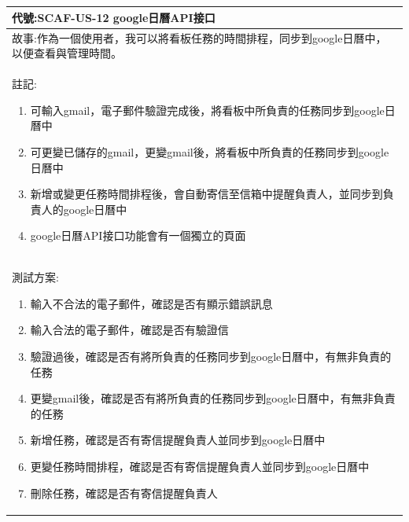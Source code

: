 \documentclass{report}
\begin{document}
\subsection*{}
\fontsize{12}{20}\selectfont
\begin{tabularx}{\textwidth}{|X|}
  \hline
  代號:SCAF-US-12 google日曆API接口 \\
  \hline
  故事:作為一個使用者，我可以將看板任務的時間排程，同步到google日曆中，以便查看與管理時間。 \\
  \hline
  註記:
  \begin{enumerate}
    \item 可輸入gmail，電子郵件驗證完成後，將看板中所負責的任務同步到google日曆中
    \item 可更變已儲存的gmail，更變gmail後，將看板中所負責的任務同步到google日曆中
    \item 新增或變更任務時間排程後，會自動寄信至信箱中提醒負責人，並同步到負責人的google日曆中
    \item google日曆API接口功能會有一個獨立的頁面
  \end{enumerate} \\
  \hline
  測試方案:
  \begin{enumerate}
    \item 輸入不合法的電子郵件，確認是否有顯示錯誤訊息
    \item 輸入合法的電子郵件，確認是否有驗證信
    \item 驗證過後，確認是否有將所負責的任務同步到google日曆中，有無非負責的任務
    \item 更變gmail後，確認是否有將所負責的任務同步到google日曆中，有無非負責的任務
    \item 新增任務，確認是否有寄信提醒負責人並同步到google日曆中
    \item 更變任務時間排程，確認是否有寄信提醒負責人並同步到google日曆中
    \item 刪除任務，確認是否有寄信提醒負責人
  \end{enumerate} \\
  \hline
\end{tabularx}
\end{document}
